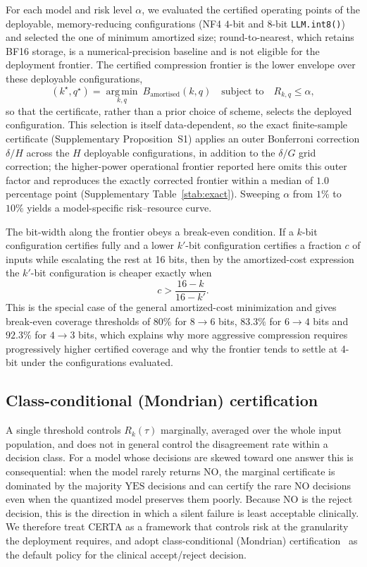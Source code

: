 \documentclass[pdflatex,sn-mathphys-num]{sn-jnl}%
\newcommand{\YES}{\mathrm{YES}}
\newcommand{\NO}{\mathrm{NO}}
\theoremstyle{thmstyleone}%
\theoremstyle{thmstyletwo}%
\theoremstyle{thmstylethree}%
\begin{document}
For each model and risk level $\alpha$, we evaluated the certified operating points of the deployable,
memory-reducing configurations (NF4 $4$-bit and $8$-bit \texttt{LLM.int8()}) and selected the one of minimum
amortized size; round-to-nearest, which retains BF16 storage, is a numerical-precision baseline and
is not eligible for the deployment frontier. The certified compression frontier is the lower envelope
over these deployable configurations,
\begin{equation}
(k^\star,q^\star)=\operatorname*{arg\,min}_{k,q}\ B_{\mathrm{amortised}}(k,q)
\quad\text{subject to}\quad R_{k,q}\le\alpha,
\end{equation}
so that the certificate, rather than a prior choice of scheme, selects the deployed configuration. This
selection is itself data-dependent, so the exact finite-sample certificate (Supplementary
Proposition~S1) applies an outer Bonferroni correction $\delta/H$ across the $H$ deployable
configurations, in addition to the $\delta/G$ grid correction; the higher-power operational frontier
reported here omits this outer factor and reproduces the exactly corrected frontier within a median of
$1.0$ percentage point (Supplementary Table~\ref{stab:exact}). Sweeping $\alpha$ from $1\%$ to $10\%$
yields a model-specific risk--resource curve.
 
The bit-width along the frontier obeys a break-even condition. If a $k$-bit configuration certifies
fully and a lower $k'$-bit configuration certifies a fraction $c$ of inputs while escalating the
rest at 16 bits, then by the amortized-cost expression the $k'$-bit configuration is cheaper exactly
when
\begin{equation}
c>\frac{16-k}{16-k'}.
\end{equation}
This is the special case of the general amortized-cost minimization and gives break-even coverage
thresholds of $80\%$ for $8\!\to\!6$ bits, $83.3\%$ for $6\!\to\!4$ bits and $92.3\%$ for
$4\!\to\!3$ bits, which explains why more aggressive compression requires progressively higher
certified coverage and why the frontier tends to settle at 4-bit under the configurations
evaluated.
 
\subsection*{Class-conditional (Mondrian) certification}
 
A single threshold controls $R_k(\tau)$ marginally, averaged over the whole input population, and
does not in general control the disagreement rate within a decision class. For a model whose
decisions are skewed toward one answer this is consequential: when the model rarely returns $\NO$,
the marginal certificate is dominated by the majority $\YES$ decisions and can certify the rare
$\NO$ decisions even when the quantized model preserves them poorly. Because $\NO$ is the reject
decision, this is the direction in which a silent failure is least acceptable clinically. We
therefore treat CERTA as a framework that controls risk at the granularity the deployment requires,
and adopt class-conditional (Mondrian) certification~\cite{vovk2003mondrian} as the default policy for the clinical
accept/reject decision.
 
\end{document}
